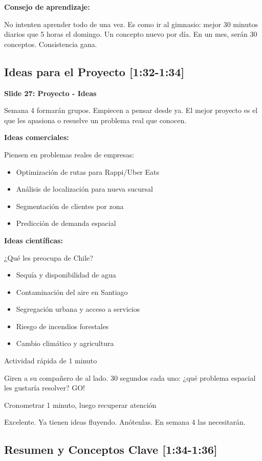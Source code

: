 \documentclass[11pt,a4paper]{article}
\newcommand{\tiempo}[1]{\textcolor{timecolor}{\faIcon{clock} \textbf{[#1]}}}
\newcommand{\decir}[1]{\begin{tcolorbox}[colback=blue!5,colframe=usachblue,title={\faIcon{microphone} DECIR}]#1\end{tcolorbox}}
\newcommand{\hacer}[1]{\begin{tcolorbox}[colback=green!5,colframe=green!50!black,title={\faIcon{hand-point-right} HACER}]#1\end{tcolorbox}}
\begin{document}
\textbf{Consejo de aprendizaje:}

\decir{No intenten aprender todo de una vez. Es como ir al gimnasio: mejor 30 minutos diarios que 5 horas el domingo. Un concepto nuevo por día. En un mes, serán 30 conceptos. Consistencia gana.}

\subsection{Ideas para el Proyecto \tiempo{1:32-1:34}}

\textbf{Slide 27: Proyecto - Ideas}

\decir{Semana 4 formarán grupos. Empiecen a pensar desde ya. El mejor proyecto es el que les apasiona o resuelve un problema real que conocen.}

\textbf{Ideas comerciales:}

\decir{
Piensen en problemas reales de empresas:
\begin{itemize}
    \item Optimización de rutas para Rappi/Uber Eats
    \item Análisis de localización para nueva sucursal
    \item Segmentación de clientes por zona
    \item Predicción de demanda espacial
\end{itemize}
}

\textbf{Ideas científicas:}

\decir{
¿Qué les preocupa de Chile?
\begin{itemize}
    \item Sequía y disponibilidad de agua
    \item Contaminación del aire en Santiago
    \item Segregación urbana y acceso a servicios
    \item Riesgo de incendios forestales
    \item Cambio climático y agricultura
\end{itemize}
}

\hacer{Actividad rápida de 1 minuto}

\decir{Giren a su compañero de al lado. 30 segundos cada uno: ¿qué problema espacial les gustaría resolver? GO!}

\hacer{Cronometrar 1 minuto, luego recuperar atención}

\decir{Excelente. Ya tienen ideas fluyendo. Anótenlas. En semana 4 las necesitarán.}

\subsection{Resumen y Conceptos Clave \tiempo{1:34-1:36}}
\end{document}

